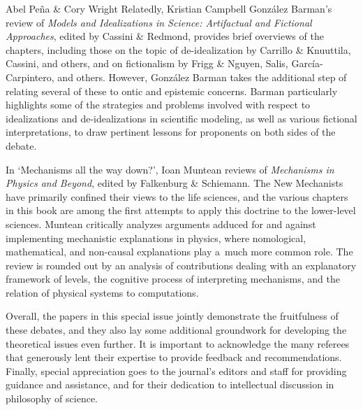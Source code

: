 \begin{editorialeng}{Abel Peña \& Cory Wright}
Relatedly, Kristian Campbell González Barman's review of \textit{Models and Idealizations in Science: Artifactual and Fictional Approaches}, edited by Cassini \& Redmond, provides brief overviews of the chapters, including those on the topic of de-idealization by Carrillo \& Knuuttila, Cassini, and others, and on fictionalism by Frigg \& Nguyen, Salis, García-Carpintero, and others. However, González Barman takes the additional step of relating several of these to ontic and epistemic concerns. Barman particularly highlights some of the strategies and problems involved with respect to idealizations and de-idealizations in scientific modeling, as well as various fictional interpretations, to draw pertinent lessons for proponents on both sides of the debate.

\enlargethispage{1.5\baselineskip}
In `Mechanisms \guillemotleft all the way down\guillemotright?', Ioan Muntean reviews of \textit{Mechanisms in Physics and Beyond}, edited by Falkenburg \& Schiemann. The New Mechanists have primarily confined their views to the life sciences, and the various chapters in this book are among the first attempts to apply this doctrine to the lower-level sciences. Muntean critically analyzes arguments adduced for and against implementing mechanistic explanations in physics, where nomological, mathematical, and non-causal explanations play a~much more common role. The review is rounded out by an analysis of contributions dealing with an explanatory framework of levels, the cognitive process of interpreting mechanisms, and the relation of physical systems to computations.

Overall, the papers in this special issue jointly demonstrate the fruitfulness of these debates, and they also lay some additional groundwork for developing the theoretical issues even further. It is important to acknowledge the many referees that generously lent their expertise to provide feedback and recommendations. Finally, special appreciation goes to the journal's editors and staff for providing guidance and assistance, and for their dedication to intellectual discussion in philosophy of science.


\end{editorialeng}
